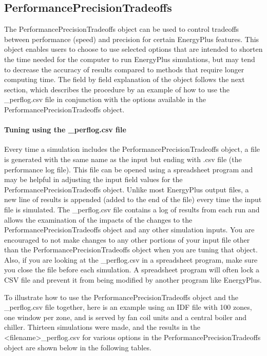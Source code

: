 \subsection{PerformancePrecisionTradeoffs}\label{performanceprecisiontradeoffs}

The PerformancePrecisionTradeoffs object can be used to control tradeoffs between performance (speed) and precision for certain EnergyPlus features. This object enables users to choose to use selected options that are intended to shorten the time needed for the computer to run EnergyPlus simulations, but may tend to decrease the accuracy of results compared to methods that require longer computing time. The field by field explanation of the object follows the next section, which describes the procedure by an example of how to use the \_perflog.csv file in conjunction with the options available in the PerformancePrecisionTradeoffs object.

\paragraph{Tuning using the \_perflog.csv file}\label{tuning-using-perlog-csv-file}

Every time a simulation includes the PerformancePrecisionTradeoffs object, a file is generated with the same name as the input but ending with \erflog.csv file (the performance log file). This file can be opened using a spreadsheet program and may be helpful in adjusting the input field values for the PerformancePrecisionTradeoffs object. Unlike most EnergyPlus output files, a new line of results is appended (added to the end of the file) every time the input file is simulated. The \_perflog.csv file contains a log of results from each run and allows the examination of the impacts of the changes to the PerformancePrecisionTradeoffs object and any other simulation inputs. You are encouraged to not make changes to any other portions of your input file other than the PerformancePrecisionTradeoffs object when you are tuning that object. Also, if you are looking at the \_perflog.csv in a spreadsheet program, make sure you close the file before each simulation. A spreadsheet program will often lock a CSV file and prevent it from being modified by another program like EnergyPlus.

To illustrate how to use the PerformancePrecisionTradeoffs object and the \_perflog.csv file together, here is an example using an IDF file with 100 zones, one window per zone, and is served by fan coil units and a central boiler and chiller. Thirteen simulations were made, and the results in the <filename>\_perflog.csv for various options in the PerformancePrecisionTradeoffs object are shown below in the following tables.


